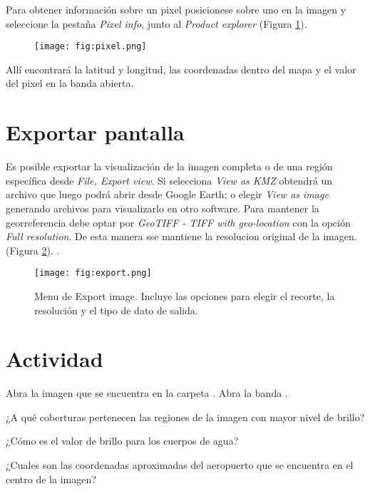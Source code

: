 Para obtener información sobre un pixel posicionese sobre uno en la imagen y seleccione la pestaña \emph{Pixel info}, junto al \emph{Product explorer} (Figura \ref{fig:pixel}).

\begin{figure}[h!]
    \centering
    \texttt{[image: fig:pixel.png]}
    \caption{}
    \label{fig:pixel}
\end{figure}

Allí encontrará la latitud y longitud, las coordenadas dentro del mapa y el valor del pixel en la banda abierta.

\section{Exportar pantalla}

Es posible exportar la visualización de la imagen completa o de una región específica desde \emph{File, Export view}. Si selecciona \emph{View as KMZ} obtendrá un archivo  que luego podrá abrir desde Google Earth; o elegir \emph{View as image} generando archivos  para visualizarlo en otro software. Para mantener la georreferencia debe optar por \emph{GeoTIFF - TIFF with geo-location} con la opción \emph{Full resolution}. De esta manera sse mantiene la resolucion original de la imagen.(Figura \ref{fig:export}).
.

\begin{figure}[h!]
    \centering
    \texttt{[image: fig:export.png]}
    \caption{Menu de Export image. Incluye las opciones para elegir el recorte, la resolución y el tipo de dato de salida.}
    \label{fig:export}
\end{figure}

\section{Actividad}

Abra la imagen que se encuentra en la carpeta . Abra la banda .

\begin{que}
    ¿A qué coberturas pertenecen las regiones de la imagen con mayor nivel de brillo?
\end{que}

\begin{que}
    ¿Cómo es el valor de brillo para los cuerpos de agua?
\end{que}

\begin{que}
    ¿Cuales son las coordenadas aproximadas del aeropuerto que se encuentra en el centro de la imagen?
\end{que}
